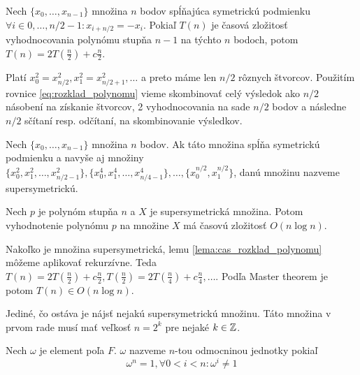 \begin{lema}
  Nech $\{x_0, \dots, x_{n-1}\}$ množina $n$ bodov spĺňajúca symetrickú
  podmienku $\forall i \in 0,\dots,n/2-1: x_{i+n/2}=-x_i $.
  Pokiaľ $T(n)$ je časová zložitosť vyhodnocovania polynómu stupňa
  $n-1$ na týchto $n$ bodoch, potom
  $T(n) = 2 T(\frac{n}{2}) + c \frac{n}{2}$.
  \label{lema:cas_rozklad_polynomu}
\end{lema}
\begin{dokaz}
  Platí $x_0^2 = x_{n/2}^2, x_1^2 = x_{n/2+1}^2, \dots$ a preto
  máme len $n/2$ rôznych štvorcov. Použitím rovnice
  \ref{eq:rozklad_polynomu} vieme skombinovať celý výsledok ako
  $n/2$ násobení na získanie štvorcov,  2 vyhodnocovania na sade $n/2$
  bodov a následne $n/2$ sčítaní resp. odčítaní, na skombinovanie
  výsledkov.
\end{dokaz}

\begin{definicia}
  Nech $\{x_0, \dots, x_{n-1}\}$ množina $n$ bodov.
  Ak táto množina spĺňa symetrickú podmienku a navyše aj množiny
  $\{x_0^2, x_1^2, \dots, x_{n/2-1}^2 \},
   \{x_0^4, x_1^4, \dots, x_{n/4-1}^4\}, \dots, \{x_0^{n/2},
   x_1^{n/2}\}$, danú množinu nazveme supersymetrickú.
\end{definicia}

\begin{lema}
    Nech $p$ je polynóm stupňa $n$ a $X$ je supersymetrická množina.
    Potom vyhodnotenie polynómu $p$ na množine $X$ má časovú zložitosť
    $O(n\log n)$.
\end{lema}
\begin{dokaz}
  Nakoľko je množina supersymetrická, lemu
  \ref{lema:cas_rozklad_polynomu} môžeme aplikovať rekurzívne.
  Teda
  $T(n) = 2 T(\frac{n}{2}) + c \frac{n}{2},
   T(\frac{n}{2}) = 2 T(\frac{n}{4}) + c \frac{n}{4}, \dots$.
  Podľa Master theorem je potom $T(n) \in O(n\log n)$.
\end{dokaz}

Jediné, čo ostáva je nájsť nejakú supersymetrickú množinu. Táto
množina v prvom rade musí mať veľkosť $n=2^k$ pre nejaké $k\in\mathbb{Z}$.

\begin{definicia}
  Nech $\omega$ je element poľa $F$. $\omega$ nazveme $n$-tou
  odmocninou jednotky pokiaľ
  \begin{equation}
    \omega^n = 1, \forall 0<i<n: \omega^i\not=1
  \end{equation}
\end{definicia}

